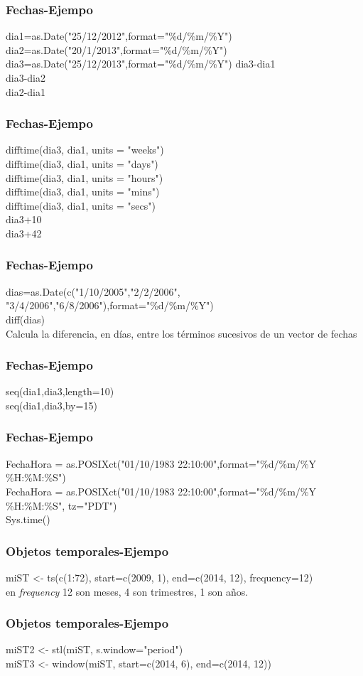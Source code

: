 \documentclass[14pt]{beamer}
\begin{document}
\begin{frame}
	\frametitle{Fechas-Ejempo}
	dia1=as.Date("25/12/2012",format="\%d/\%m/\%Y")
	dia2=as.Date("20/1/2013",format="\%d/\%m/\%Y")
	dia3=as.Date("25/12/2013",format="\%d/\%m/\%Y")
	dia3-dia1\\
	dia3-dia2\\
	dia2-dia1	
	
\end{frame}

\begin{frame}
	\frametitle{Fechas-Ejempo}
	difftime(dia3, dia1, units = "weeks")\\
	difftime(dia3, dia1, units = "days")\\
	difftime(dia3, dia1, units = "hours")\\
	difftime(dia3, dia1, units = "mins")\\
	difftime(dia3, dia1, units = "secs")\\
	dia3+10\\
	dia3+42
\end{frame}

\begin{frame}
	\frametitle{Fechas-Ejempo}
	dias=as.Date(c("1/10/2005","2/2/2006",\\
	"3/4/2006","6/8/2006"),format="\%d/\%m/\%Y")\\
	diff(dias)\\
	Calcula la diferencia, en días, entre los términos sucesivos de un vector de fechas 
\end{frame}

\begin{frame}
	\frametitle{Fechas-Ejempo}
	seq(dia1,dia3,length=10)\\
	seq(dia1,dia3,by=15)\\
\end{frame}

\begin{frame}
	\frametitle{Fechas-Ejempo}
	FechaHora = as.POSIXct("01/10/1983 22:10:00",format="\%d/\%m/\%Y \%H:\%M:\%S")\\
	
	FechaHora = as.POSIXct("01/10/1983 22:10:00",format="\%d/\%m/\%Y \%H:\%M:\%S", tz="PDT")\\
	Sys.time()
	
\end{frame}


\begin{frame}
	\frametitle{Objetos temporales-Ejempo}
	miST <- ts(c(1:72), start=c(2009, 1), end=c(2014, 12), frequency=12)\\
	
	en \textit{frequency} 12 son meses, 4 son trimestres, 1 son años.
	
\end{frame}

\begin{frame}
	\frametitle{Objetos temporales-Ejempo}
	miST2 <- stl(miST, s.window="period")\\
	
	miST3 <- window(miST, start=c(2014, 6), end=c(2014, 12))
	
	
\end{frame}
\end{document}
